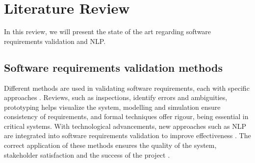 \section{Literature Review}
\sloppy
In this review, we will present the state of the art regarding software requirements validation and NLP.
\subsection{Software requirements validation methods}
Different methods are used in validating software requirements, each with specific approaches \cite{Wiegers2013}. Reviews, such as inspections, identify errors and ambiguities, prototyping helps visualize the system, modelling and simulation ensure consistency of requirements, and formal techniques offer rigour, being essential in critical systems. With technological advancements, new approaches such as NLP are integrated into software requirements validation to improve effectiveness \cite{AvilaPaldes2016, bird2009, Sommerville2016}. The correct application of these methods ensures the quality of the system, stakeholder satisfaction and the success of the project \cite{Wiegers2013}.
